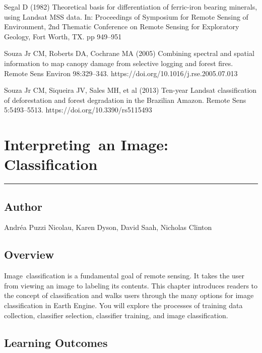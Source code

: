 \documentclass[
  letterpaper,
  DIV=11,
  numbers=noendperiod]{scrreprt}
\begin{document}
Segal D (1982) Theoretical basis for differentiation of ferric-iron
bearing minerals, using Landsat MSS data. In: Proceedings of Symposium
for Remote Sensing of Environment, 2nd Thematic Conference on Remote
Sensing for Exploratory Geology, Fort Worth, TX. pp 949--951

Souza Jr CM, Roberts DA, Cochrane MA (2005) Combining spectral and
spatial information to map canopy damage from selective logging and
forest fires. Remote Sens Environ 98:329--343.
https://doi.org/10.1016/j.rse.2005.07.013

Souza Jr CM, Siqueira JV, Sales MH, et al (2013) Ten-year Landsat
classification of deforestation and forest degradation in the Brazilian
Amazon. Remote Sens 5:5493--5513. https://doi.org/10.3390/rs5115493

\hypertarget{interpreting-an-image-classification}{%
\chapter{Interpreting~an Image:
Classification}\label{interpreting-an-image-classification}}

\begin{center}\rule{0.5\linewidth}{0.5pt}\end{center}

\hypertarget{author-3}{%
\section*{Author}\label{author-3}}


Andréa Puzzi Nicolau, Karen Dyson, David Saah, Nicholas Clinton

\hypertarget{overview-5}{%
\section*{Overview}\label{overview-5}}


Image~classification is a fundamental goal of remote sensing. It takes
the user from viewing an image to labeling its contents. This chapter
introduces readers to the concept of classification and walks users
through the many options for image classification in Earth Engine. You
will explore the processes of training data collection, classifier
selection, classifier training, and image classification.

\hypertarget{learning-outcomes-5}{%
\section*{Learning Outcomes}\label{learning-outcomes-5}}
\end{document}
